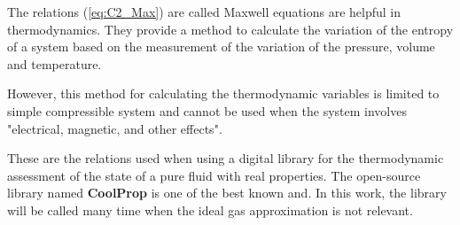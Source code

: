 The relations (\ref{eq:C2_Max}) are called Maxwell equations are helpful in thermodynamics. They provide a method to calculate the variation of the entropy of a system based on the measurement of the variation of the pressure, volume and temperature.

However, this method for calculating the thermodynamic variables is limited to simple compressible system and cannot be used when the system involves "electrical, magnetic, and other effects"\cite{2015}.

These are the relations used when using a digital library for the thermodynamic assessment of the state of a pure fluid with real properties. The open-source library named \textbf{CoolProp}\cite{Bell2014} is one of the best known and. In this work, the library will be called many time when the ideal gas approximation is not relevant.\\

%
%

